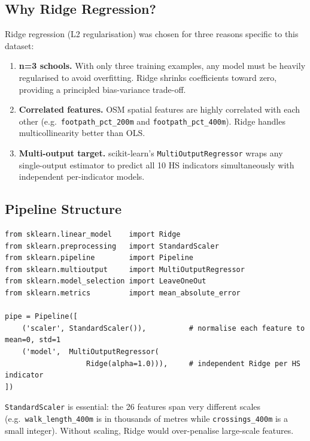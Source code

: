 \documentclass[11pt,a4paper,openany]{book}
\begin{document}
\subsection{Why Ridge Regression?}

Ridge regression (L2 regularisation) was chosen for three reasons specific to this dataset:

\begin{enumerate}
  \item \textbf{n=3 schools.} With only three training examples, any model must be heavily regularised to avoid overfitting. Ridge shrinks coefficients toward zero, providing a principled bias-variance trade-off.
  \item \textbf{Correlated features.} OSM spatial features are highly correlated with each other (e.g.\ \texttt{footpath\_pct\_200m} and \texttt{footpath\_pct\_400m}). Ridge handles multicollinearity better than OLS.
  \item \textbf{Multi-output target.} scikit-learn's \texttt{MultiOutputRegressor} wraps any single-output estimator to predict all 10 HS indicators simultaneously with independent per-indicator models.
\end{enumerate}

\subsection{Pipeline Structure}

\begin{lstlisting}[style=python, caption={The full scikit-learn pipeline in ml\_model.py.}]
from sklearn.linear_model    import Ridge
from sklearn.preprocessing   import StandardScaler
from sklearn.pipeline        import Pipeline
from sklearn.multioutput     import MultiOutputRegressor
from sklearn.model_selection import LeaveOneOut
from sklearn.metrics         import mean_absolute_error

pipe = Pipeline([
    ('scaler', StandardScaler()),          # normalise each feature to mean=0, std=1
    ('model',  MultiOutputRegressor(
                   Ridge(alpha=1.0))),     # independent Ridge per HS indicator
])
\end{lstlisting}

\texttt{StandardScaler} is essential: the 26 features span very different scales (e.g.\ \texttt{walk\_length\_400m} is in thousands of metres while \texttt{crossings\_400m} is a small integer). Without scaling, Ridge would over-penalise large-scale features.
\end{document}
